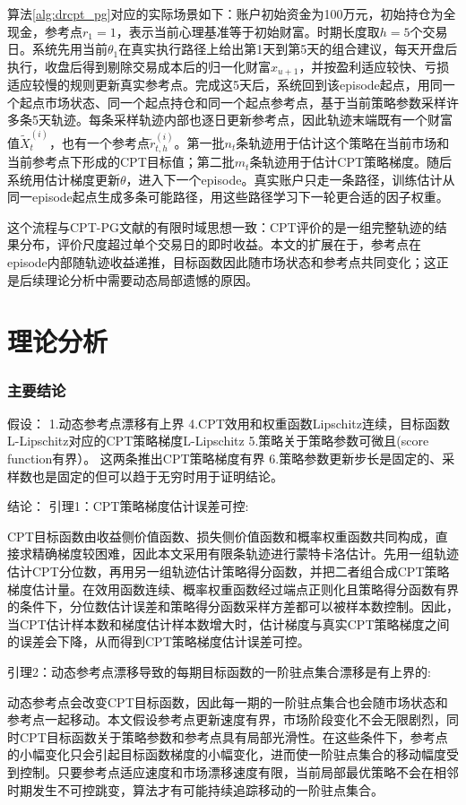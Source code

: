 \documentclass{sufethesismas}
\begin{document}
算法\ref{alg:drcpt_pg}对应的实际场景如下：账户初始资金为100万元，初始持仓为全现金，参考点$r_1=1$，表示当前心理基准等于初始财富。时期长度取$h=5$个交易日。系统先用当前$\theta_1$在真实执行路径上给出第1天到第5天的组合建议，每天开盘后执行，收盘后得到剔除交易成本后的归一化财富$x_{u+1}$，并按盈利适应较快、亏损适应较慢的规则更新真实参考点。完成这5天后，系统回到该episode起点，用同一个起点市场状态、同一个起点持仓和同一个起点参考点，基于当前策略参数采样许多条5天轨迹。每条采样轨迹内部也逐日更新参考点，因此轨迹末端既有一个财富值$\widetilde X_t^{(i)}$，也有一个参考点$\widetilde r_{t,h}^{(i)}$。第一批$n_t$条轨迹用于估计这个策略在当前市场和当前参考点下形成的CPT目标值；第二批$m_t$条轨迹用于估计CPT策略梯度。随后系统用估计梯度更新$\theta$，进入下一个episode。真实账户只走一条路径，训练估计从同一episode起点生成多条可能路径，用这些路径学习下一轮更合适的因子权重。

这个流程与CPT-PG文献的有限时域思想一致：CPT评价的是一组完整轨迹的结果分布，评价尺度超过单个交易日的即时收益\citep{prashanth2016cumulative,lepel2026policygradients}。本文的扩展在于，参考点在episode内部随轨迹收益递推，目标函数因此随市场状态和参考点共同变化；这正是后续理论分析中需要动态局部遗憾的原因。
\chapter{理论分析}
\subsection{主要结论}
假设：
1.动态参考点漂移有上界
4.CPT效用和权重函数Lipschitz连续，目标函数L-Lipschitz对应的CPT策略梯度L-Lipschitz
5.策略关于策略参数可微且(score function有界）。
这两条推出CPT策略梯度有界
6.策略参数更新步长是固定的、采样数也是固定的但可以趋于无穷时用于证明结论。

结论：
引理1：CPT策略梯度估计误差可控:

CPT目标函数由收益侧价值函数、损失侧价值函数和概率权重函数共同构成，直接求精确梯度较困难，因此本文采用有限条轨迹进行蒙特卡洛估计。先用一组轨迹估计CPT分位数，再用另一组轨迹估计策略得分函数，并把二者组合成CPT策略梯度估计量。在效用函数连续、概率权重函数经过端点正则化且策略得分函数有界的条件下，分位数估计误差和策略得分函数采样方差都可以被样本数控制。因此，当CPT估计样本数和梯度估计样本数增大时，估计梯度与真实CPT策略梯度之间的误差会下降，从而得到CPT策略梯度估计误差可控。

引理2：动态参考点漂移导致的每期目标函数的一阶驻点集合漂移是有上界的:

动态参考点会改变CPT目标函数，因此每一期的一阶驻点集合也会随市场状态和参考点一起移动。本文假设参考点更新速度有界，市场阶段变化不会无限剧烈，同时CPT目标函数关于策略参数和参考点具有局部光滑性。在这些条件下，参考点的小幅变化只会引起目标函数梯度的小幅变化，进而使一阶驻点集合的移动幅度受到控制。只要参考点适应速度和市场漂移速度有限，当前局部最优策略不会在相邻时期发生不可控跳变，算法才有可能持续追踪移动的一阶驻点集合。
\end{document}

